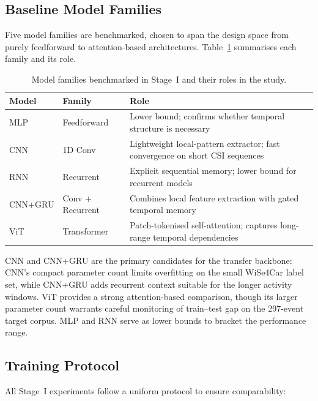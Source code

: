 \documentclass[english,bibtex]{kththesis}
\begin{document}
\subsection{Baseline Model Families}
\label{sec:architectures}

Five model families are benchmarked, chosen to span the design space from purely feedforward to attention-based architectures. Table~\ref{tab:models} summarises each family and its role.

\begin{table}[!ht]
\caption{Model families benchmarked in Stage~I and their roles in the study.}
\label{tab:models}
\centering
\small
\begin{tabular}{llp{7.8cm}}
\toprule
\textbf{Model} & \textbf{Family} & \textbf{Role} \\
\midrule
MLP      & Feedforward         & Lower bound; confirms whether temporal structure is necessary \\
CNN      & 1D Conv             & Lightweight local-pattern extractor; fast convergence on short CSI sequences \\
\glsadd{RNN}RNN      & Recurrent           & Explicit sequential memory; lower bound for recurrent models \\
CNN+GRU  & Conv + Recurrent    & Combines local feature extraction with gated temporal memory \\
ViT      & Transformer         & Patch-tokenised self-attention; captures long-range temporal dependencies \\
\bottomrule
\end{tabular}
\end{table}

CNN and CNN+GRU are the primary candidates for the transfer backbone: CNN's compact parameter count limits overfitting on the small WiSe4Car label set, while CNN+GRU adds recurrent context suitable for the longer activity windows. ViT provides a strong attention-based comparison, though its larger parameter count warrants careful monitoring of train--test gap on the 297-event target corpus. MLP and RNN serve as lower bounds to bracket the performance range.

\subsection{Training Protocol}
\label{sec:trainprotocol}

All Stage~I experiments follow a uniform protocol to ensure comparability:
\end{document}
